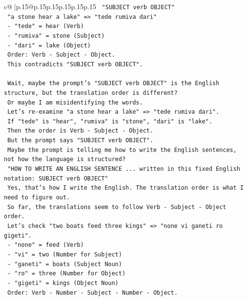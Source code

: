\documentclass{article}
\begin{document}
{\begin{supertabular}{c@{$\;$}|p{.15\linewidth}@{}p{.15\linewidth}p{.15\linewidth}p{.15\linewidth}p{.15\linewidth}p{.15\linewidth}}
{{{\texttt{   "SUBJECT  verb  OBJECT"} \\
\texttt{   "a stone hear a lake" => "tede rumiva dari"} \\
\texttt{   {-} "tede" = hear (Verb)} \\
\texttt{   {-} "rumiva" = stone (Subject)} \\
\texttt{   {-} "dari" = lake (Object)} \\
\texttt{   Order: Verb {-} Subject {-} Object.} \\
\texttt{   This contradicts "SUBJECT verb OBJECT".} \\
\\ 
\texttt{   Wait, maybe the prompt's "SUBJECT  verb  OBJECT" is the English structure, but the translation order is different?} \\
\texttt{   Or maybe I am misidentifying the words.} \\
\texttt{   Let's re{-}examine "a stone hear a lake" => "tede rumiva dari".} \\
\texttt{   If "tede" is "hear", "rumiva" is "stone", "dari" is "lake".} \\
\texttt{   Then the order is Verb {-} Subject {-} Object.} \\
\texttt{   But the prompt says "SUBJECT  verb  OBJECT".} \\
\texttt{   Maybe the prompt is telling me how to write the English sentences, not how the language is structured?} \\
\texttt{   "HOW TO WRITE AN ENGLISH SENTENCE ... written in this fixed English notation: SUBJECT  verb  OBJECT"} \\
\texttt{   Yes, that's how I write the English. The translation order is what I need to figure out.} \\
\texttt{   So far, the translations seem to follow Verb {-} Subject {-} Object order.} \\
\texttt{   Let's check "two boats feed three kings" => "none vi ganeti ro gigeti".} \\
\texttt{   {-} "none" = feed (Verb)} \\
\texttt{   {-} "vi" = two (Number for Subject)} \\
\texttt{   {-} "ganeti" = boats (Subject Noun)} \\
\texttt{   {-} "ro" = three (Number for Object)} \\
\texttt{   {-} "gigeti" = kings (Object Noun)} \\
\texttt{   Order: Verb {-} Number {-} Subject {-} Number {-} Object.} \\
}}}
\end{supertabular}}
\end{document}
